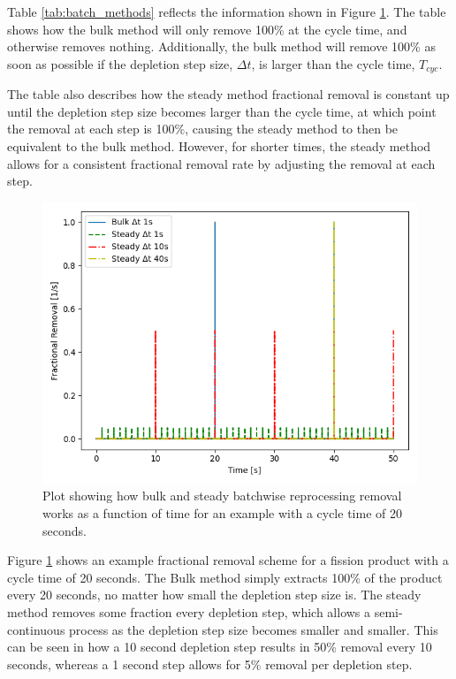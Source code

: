 Table \ref{tab:batch_methods} reflects the information shown in Figure \ref{fig:bulk_repr_cnst}. The table shows how the bulk method will only remove 100\% at the cycle time, and otherwise removes nothing. Additionally, the bulk method will remove 100\% as soon as possible if the depletion step size, $\Delta t$, is larger than the cycle time, $T_{cyc}$. 

The table also describes how the steady method fractional removal is constant up until the depletion step size becomes larger than the cycle time, at which point the removal at each step is 100\%, causing the steady method to then be equivalent to the bulk method. However, for shorter times, the steady method allows for a consistent fractional removal rate by adjusting the removal at each step.


\begin{figure}[H]
  \centering
  \includegraphics[scale=0.45]{images/bulk-compare-cycles.png}
  \caption{Plot showing how bulk and steady batchwise reprocessing removal works as a function of time for an example with a cycle time of 20 seconds.}
   \label{fig:bulk_repr_cnst}
\end{figure}

Figure \ref{fig:bulk_repr_cnst} shows an example fractional removal scheme for a fission product with a cycle time of 20 seconds. The Bulk method simply extracts 100\% of the product every 20 seconds, no matter how small the depletion step size is. The steady method removes some fraction every depletion step, which allows a semi-continuous process as the depletion step size becomes smaller and smaller. This can be seen in how a 10 second depletion step results in 50\% removal every 10 seconds, whereas a 1 second step allows for 5\% removal per depletion step.


